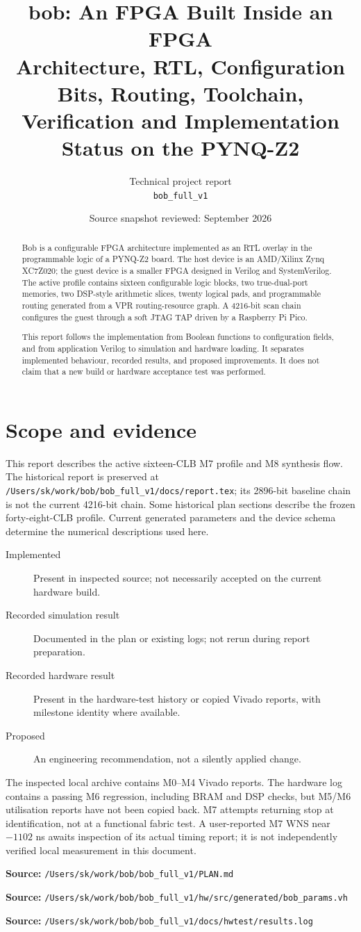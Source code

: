 \documentclass[11pt,a4paper]{article}
\title{\textbf{bob: An FPGA Built Inside an FPGA}\\[3mm]
\large Architecture, RTL, Configuration Bits, Routing, Toolchain,\\
Verification and Implementation Status on the PYNQ-Z2}
\author{Technical project report\\\texttt{bob\_full\_v1}}
\date{Source snapshot reviewed: September 2026}
\newcommand{\code}[1]{\texttt{\detokenize{#1}}}
\newcommand{\src}[1]{\par\smallskip\noindent\textbf{Source: }\nolinkurl{/Users/sk/work/bob/bob_full_v1/#1}\par\smallskip}
\begin{document}
\maketitle
\begin{abstract}
Bob is a configurable FPGA architecture implemented as an RTL overlay in the
programmable logic of a PYNQ-Z2 board. The host device is an AMD/Xilinx Zynq
XC7Z020; the guest device is a smaller FPGA designed in Verilog and SystemVerilog.
The active profile contains sixteen configurable logic blocks, two true-dual-port
memories, two DSP-style arithmetic slices, twenty logical pads, and programmable
routing generated from a VPR routing-resource graph. A 4216-bit scan chain
configures the guest through a soft JTAG TAP driven by a Raspberry Pi Pico.

This report follows the implementation from Boolean functions to configuration
fields, and from application Verilog to simulation and hardware loading. It
separates implemented behaviour, recorded results, and proposed improvements.
It does not claim that a new build or hardware acceptance test was performed.
\end{abstract}
\tableofcontents
\newpage

\section{Scope and evidence}
\label{sec:scope}
This report describes the active sixteen-CLB M7 profile and M8 synthesis flow.
The historical report is preserved at
\nolinkurl{/Users/sk/work/bob/bob_full_v1/docs/report.tex}; its 2896-bit baseline
chain is not the current 4216-bit chain. Some historical plan sections describe
the frozen forty-eight-CLB profile. Current generated parameters and the device
schema determine the numerical descriptions used here.

\begin{description}
\item[Implemented] Present in inspected source; not necessarily accepted on the
current hardware build.
\item[Recorded simulation result] Documented in the plan or existing logs; not
rerun during report preparation.
\item[Recorded hardware result] Present in the hardware-test history or copied
Vivado reports, with milestone identity where available.
\item[Proposed] An engineering recommendation, not a silently applied change.
\end{description}
The inspected local archive contains M0--M4 Vivado reports. The hardware log
contains a passing M6 regression, including BRAM and DSP checks, but M5/M6
utilisation reports have not been copied back. M7 attempts returning
\code{0xFFFFFFFF} stop at identification, not at a functional fabric test.
A user-reported M7 WNS near $-1102$ ns awaits inspection of its actual timing
report; it is not independently verified local measurement in this document.
\src{PLAN.md}
\src{hw/src/generated/bob_params.vh}
\src{docs/hwtest/results.log}
\end{document}
